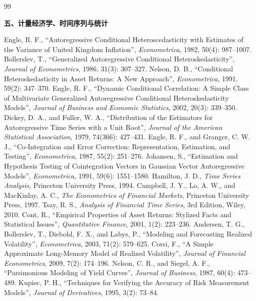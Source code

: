 \begin{thebibliography}{99}
\item[] \textbf{五、计量经济学、时间序列与统计}

 Engle, R. F., ``Autoregressive Conditional Heteroscedasticity with Estimates of the Variance of United Kingdom Inflation'', \emph{Econometrica}, 1982, 50(4): 987--1007.
 Bollerslev, T., ``Generalized Autoregressive Conditional Heteroskedasticity'', \emph{Journal of Econometrics}, 1986, 31(3): 307--327.
 Nelson, D. B., ``Conditional Heteroskedasticity in Asset Returns: A New Approach'', \emph{Econometrica}, 1991, 59(2): 347--370.
 Engle, R. F., ``Dynamic Conditional Correlation: A Simple Class of Multivariate Generalized Autoregressive Conditional Heteroskedasticity Models'', \emph{Journal of Business and Economic Statistics}, 2002, 20(3): 339--350.
 Dickey, D. A., and Fuller, W. A., ``Distribution of the Estimators for Autoregressive Time Series with a Unit Root'', \emph{Journal of the American Statistical Association}, 1979, 74(366): 427--431.
 Engle, R. F., and Granger, C. W. J., ``Co-Integration and Error Correction: Representation, Estimation, and Testing'', \emph{Econometrica}, 1987, 55(2): 251--276.
 Johansen, S., ``Estimation and Hypothesis Testing of Cointegration Vectors in Gaussian Vector Autoregressive Models'', \emph{Econometrica}, 1991, 59(6): 1551--1580.
 Hamilton, J. D., \emph{Time Series Analysis}, Princeton University Press, 1994.
 Campbell, J. Y., Lo, A. W., and MacKinlay, A. C., \emph{The Econometrics of Financial Markets}, Princeton University Press, 1997.
 Tsay, R. S., \emph{Analysis of Financial Time Series}, 3rd Edition, Wiley, 2010.
 Cont, R., ``Empirical Properties of Asset Returns: Stylized Facts and Statistical Issues'', \emph{Quantitative Finance}, 2001, 1(2): 223--236.
 Andersen, T. G., Bollerslev, T., Diebold, F. X., and Labys, P., ``Modeling and Forecasting Realized Volatility'', \emph{Econometrica}, 2003, 71(2): 579--625.
 Corsi, F., ``A Simple Approximate Long-Memory Model of Realized Volatility'', \emph{Journal of Financial Econometrics}, 2009, 7(2): 174--196.
 Nelson, C. R., and Siegel, A. F., ``Parsimonious Modeling of Yield Curves'', \emph{Journal of Business}, 1987, 60(4): 473--489.
 Kupiec, P. H., ``Techniques for Verifying the Accuracy of Risk Measurement Models'', \emph{Journal of Derivatives}, 1995, 3(2): 73--84.

\end{thebibliography}

